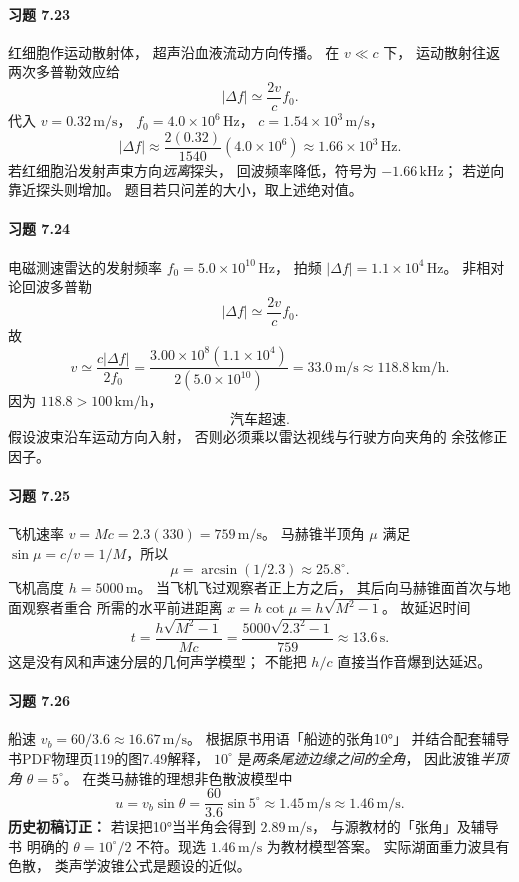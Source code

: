 \paragraph{习题 7.23}
红细胞作运动散射体，
超声沿血液流动方向传播。
在 \(v\ll c\) 下，
运动散射往返两次多普勒效应给
\[
 \boxed{|\Delta f|\simeq
 \frac{2v}{c}f_0}.
\]
代入 \(v=0.32\,\mathrm{m/s}\)，
\(f_0=4.0\times10^6\,\mathrm{Hz}\)，
\(c=1.54\times10^3\,\mathrm{m/s}\)，
\[
 \boxed{|\Delta f|\approx
 \frac{2(0.32)}{1540}(4.0\times10^6)
 \approx1.66\times10^3\,\mathrm{Hz}}.
\]
若红细胞沿发射声束方向\emph{远离}探头，
回波频率降低，符号为
\(-1.66\,\mathrm{kHz}\)；
若逆向靠近探头则增加。
题目若只问差的大小，取上述绝对值。

\paragraph{习题 7.24}
电磁测速雷达的发射频率
\(f_0=5.0\times10^{10}\,\mathrm{Hz}\)，
拍频
\(|\Delta f|=1.1\times10^4\,\mathrm{Hz}\)。
非相对论回波多普勒
\[
 |\Delta f|\simeq\frac{2v}{c}f_0.
\]
故
\[
 \boxed{v\simeq\frac{c|\Delta f|}{2f_0}
 =\frac{3.00\times10^8(1.1\times10^4)}
 {2(5.0\times10^{10})}
 =33.0\,\mathrm{m/s}
 \approx118.8\,\mathrm{km/h}}.
\]
因为 \(118.8>100\,\mathrm{km/h}\)，
\[
 \boxed{\text{汽车超速}}.
\]
假设波束沿车运动方向入射，
否则必须乘以雷达视线与行驶方向夹角的
余弦修正因子。

\paragraph{习题 7.25}
飞机速率 \(v=Mc=2.3(330)
 =759\,\mathrm{m/s}\)。
马赫锥半顶角 \(\mu\) 满足
\(\sin\mu=c/v=1/M\)，所以
\[
 \boxed{\mu=\arcsin(1/2.3)
 \approx25.8^\circ}.
\]
飞机高度
\(h=5000\,\mathrm m\)。
当飞机飞过观察者正上方之后，
其后向马赫锥面首次与地面观察者重合
所需的水平前进距离
\(x=h\cot\mu=h\sqrt{M^2-1}\)。
故延迟时间
\[
 \boxed{t=\frac{h\sqrt{M^2-1}}{Mc}
 =\frac{5000\sqrt{2.3^2-1}}{759}
 \approx13.6\,\mathrm s}.
\]
这是没有风和声速分层的几何声学模型；
不能把 \(h/c\) 直接当作音爆到达延迟。

\paragraph{习题 7.26}
船速
\(v_b=60/3.6\approx16.67\,\mathrm{m/s}\)。
根据原书用语「船迹的张角10°」
并结合配套辅导书PDF物理页119的图7.49解释，
\(10^\circ\) 是\emph{两条尾迹边缘之间的全角}，
因此波锥\emph{半顶角}
\(\theta=5^\circ\)。
在类马赫锥的理想非色散波模型中
\[
 \boxed{u=v_b\sin\theta
 =\frac{60}{3.6}\sin5^\circ
 \approx1.45\,\mathrm{m/s}\approx1.46\,\mathrm{m/s}}.
\]
\textbf{历史初稿订正：}
若误把10°当半角会得到
\(2.89\,\mathrm{m/s}\)，
与源教材的「张角」及辅导书
明确的 \(\theta=10^\circ/2\)
不符。现选 \(1.46\,\mathrm{m/s}\) 为教材模型答案。
实际湖面重力波具有色散，
类声学波锥公式是题设的近似。

